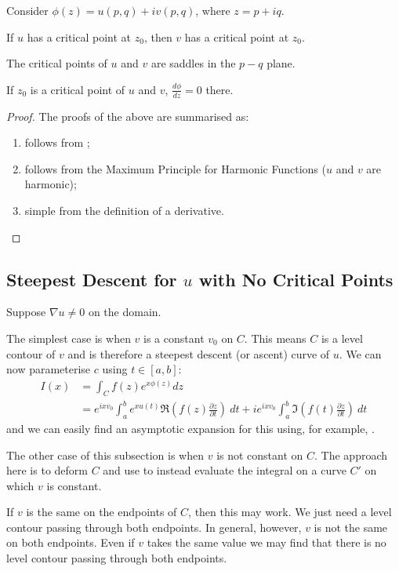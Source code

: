 \documentclass[../Main.tex]{subfiles}
\begin{document}
\begin{propositions}{
        Consider $\phi(z) = u(p, q) + i v(p, q)$, where $z = p + iq$.
        \label{propsCritPoints}
    }
    \item If $u$ has a critical point at $z_0$, then $v$ has a critical point at $z_0$. \label{propCritPointShared}
    \item The critical points of $u$ and $v$ are saddles in the $p-q$ plane.\label{propCritPointOnlySaddle}
    \item If $z_0$ is a critical point of $u$ and $v$, $\frac{d\phi}{dz} = 0$ there. \label{propCritPointZeroDeriv}
\end{propositions}
\begin{proof}
    The proofs of the above are summarised as:
    \begin{enumerate}
        \item follows from ;
        \item follows from the Maximum Principle for Harmonic Functions ($u$ and $v$ are harmonic);
        \item simple from the definition of a derivative.
    \end{enumerate}
\end{proof}
\subsection{Steepest Descent for \texorpdfstring{$u$}{u} with No Critical Points}
Suppose $\nabla u \neq 0$ on the domain.

The simplest case is when $v$ is a constant $v_0$ on $C$. This means $C$ is a level contour of $v$ and is therefore a steepest descent (or ascent) curve of $u$. We can now parameterise $c$ using $t \in [a, b]$:
\begin{align*}
    I(x) &= \int_C f(z) e^{x\phi(z)} dz \\
    &= e^{ixv_0} \int_{a}^{b} e^{xu(t)} \Re\left(f(z) \frac{\partial z}{\partial t}\right)~dt + i e^{i x v_0} \int_{a}^{b} \Im\left(f(t) \frac{\partial z}{\partial t}\right)~dt 
\end{align*}
and we can easily find an asymptotic expansion for this using, for example, .

The other case of this subsection is when $v$ is not constant on $C$. The approach here is to deform $C$ and use  to instead evaluate the integral on a curve $C'$ on which $v$ is constant.

If $v$ is the same on the endpoints of $C$, then this may work. We just need a level contour passing through both endpoints. In general, however, $v$ is not the same on both endpoints. Even if $v$ takes the same value we may find that there is no level contour passing through both endpoints.
\end{document}
